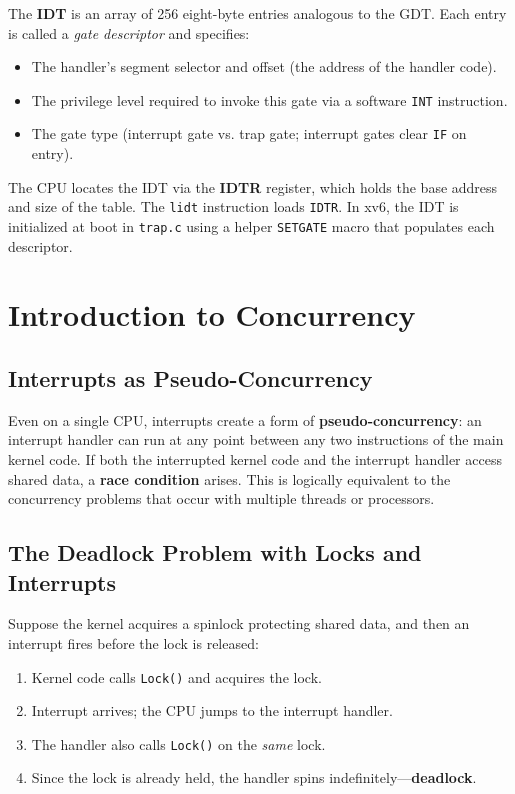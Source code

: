 \documentclass[11pt]{article}
\begin{document}
The \textbf{IDT} is an array of 256 eight-byte entries analogous to the GDT. Each entry is called a \emph{gate descriptor} and specifies:
\begin{itemize}
    \item The handler's segment selector and offset (the address of the handler code).
    \item The privilege level required to invoke this gate via a software \texttt{INT} instruction.
    \item The gate type (interrupt gate vs. trap gate; interrupt gates clear \texttt{IF} on entry).
\end{itemize}

The CPU locates the IDT via the \textbf{IDTR} register, which holds the base address and size of the table. The \texttt{lidt} instruction loads \texttt{IDTR}. In xv6, the IDT is initialized at boot in \texttt{trap.c} using a helper \texttt{SETGATE} macro that populates each descriptor.

\section{Introduction to Concurrency}

\subsection{Interrupts as Pseudo-Concurrency}

Even on a single CPU, interrupts create a form of \textbf{pseudo-concurrency}: an interrupt handler can run at any point between any two instructions of the main kernel code. If both the interrupted kernel code and the interrupt handler access shared data, a \textbf{race condition} arises. This is logically equivalent to the concurrency problems that occur with multiple threads or processors.

\subsection{The Deadlock Problem with Locks and Interrupts}

Suppose the kernel acquires a spinlock protecting shared data, and then an interrupt fires before the lock is released:

\begin{enumerate}
    \item Kernel code calls \texttt{Lock()} and acquires the lock.
    \item Interrupt arrives; the CPU jumps to the interrupt handler.
    \item The handler also calls \texttt{Lock()} on the \emph{same} lock.
    \item Since the lock is already held, the handler spins indefinitely---\textbf{deadlock}.
\end{enumerate}
\end{document}
